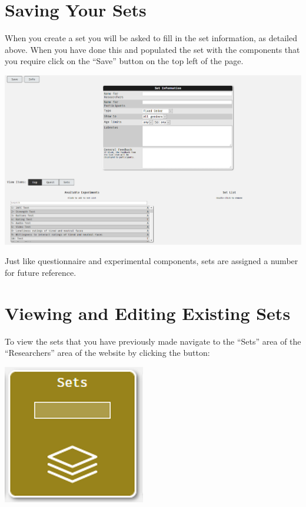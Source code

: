 \documentclass[]{book}
\begin{document}
\section{Saving Your Sets}\label{saving-your-sets}

When you create a set you will be asked to fill in the set information,
as detailed above. When you have done this and populated the set with
the components that you require click on the ``Save'' button on the top
left of the page.

\includegraphics{images/screenshots/sets_3.png}

Just like questionnaire and experimental components, sets are assigned a
number for future reference.

\section{Viewing and Editing Existing
Sets}\label{viewing-and-editing-existing-sets}

To view the sets that you have previously made navigate to the ``Sets''
area of the ``Researchers'' area of the website by clicking the button:

\includegraphics{images/screenshots/sets_1.png}
\end{document}
